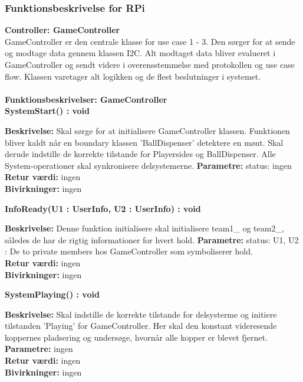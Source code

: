 \documentclass[Arkitektur/System_main.tex]{subfiles}
\begin{document}
\subsubsection{Funktionsbeskrivelse for RPi}
\large{\textbf{Controller:  GameController}}\\
GameController er den centrale klasse for use case 1 - 3. Den sørger for at sende og modtage data gennem klassen I2C. Alt modtaget data bliver evalueret i GameController og sendt videre i overensstemmelse med protokollen og use case flow. Klassen varetager alt logikken og de flest beslutninger i systemet.\\\\
{\large\textbf{Funktionsbeskrivelser: GameController}}\\[0.2cm]
\textbf{SystemStart() : void}
\begin{adjustwidth}{1cm}{0pt}
\textbf{Beskrivelse:} Skal sørge for at initialisere GameController klassen. Funktionen bliver kaldt når en boundary klassen 'BallDispenser' detektere en mønt. Skal derude indstille de korrekte tilstande for Playersides og BallDispenser. Alle System-operationer skal synkronisere delsystemerne.   
\textbf{Parametre:} status: ingen \\[0.2cm]
\textbf{Retur værdi:} ingen \\[0.2cm]
\textbf{Bivirkninger:} ingen \\[0.2cm]
\end{adjustwidth}

\textbf{InfoReady(U1 : UserInfo, U2 : UserInfo) : void}
\begin{adjustwidth}{1cm}{0pt}
\textbf{Beskrivelse:} Denne funktion initialisere skal initialisere team1\_ og team2\_, således de har de rigtig informationer for hvert hold. 
\textbf{Parametre:} status: U1, U2 : De to private members hos GameController som symboliserer hold.  \\[0.2cm]
\textbf{Retur værdi:} ingen \\[0.2cm]
\textbf{Bivirkninger:} ingen \\[0.2cm]
\end{adjustwidth}

\textbf{SystemPlaying() : void}
\begin{adjustwidth}{1cm}{0pt}
\textbf{Beskrivelse:} Skal indstille de korrekte tilstande for delsysterme og initiere tilstanden 'Playing' for GameController. Her skal den konstant videresende koppernes pladsering og undersøge, hvornår alle kopper er blevet fjernet. 
\textbf{Parametre:} ingen \\[0.2cm]
\textbf{Retur værdi:} ingen \\[0.2cm]
\textbf{Bivirkninger:} ingen \\[0.2cm]
\end{adjustwidth}
\end{document}
